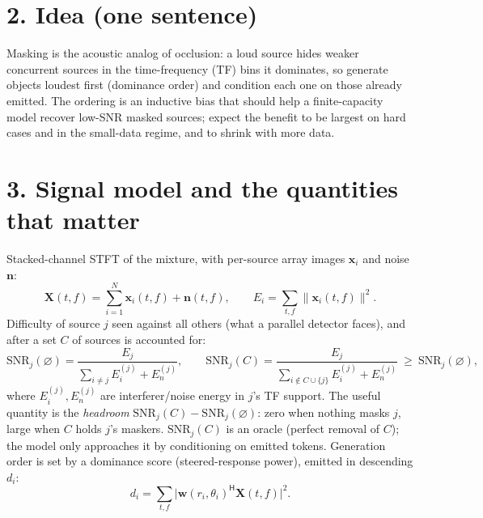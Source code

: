 \documentclass[10pt]{article}
\newcommand{\bX}{\mathbf{X}}
\newcommand{\bx}{\mathbf{x}}
\newcommand{\bn}{\mathbf{n}}
\newcommand{\bw}{\mathbf{w}}
\begin{document}
\section*{2. Idea (one sentence)}
Masking is the acoustic analog of occlusion: a loud source hides weaker concurrent
sources in the time-frequency (TF) bins it dominates, so generate objects loudest
first (dominance order) and condition each one on those already emitted. The
ordering is an inductive bias that should help a finite-capacity model recover
low-SNR masked sources; expect the benefit to be largest on hard cases and in the
small-data regime, and to shrink with more data.

\section*{3. Signal model and the quantities that matter}
Stacked-channel STFT of the mixture, with per-source array images $\bx_i$ and noise
$\bn$:
\begin{equation}
\bX(t,f)=\sum_{i=1}^{N}\bx_i(t,f)+\bn(t,f),\qquad E_i=\sum_{t,f}\|\bx_i(t,f)\|^2 .
\end{equation}
Difficulty of source $j$ seen against all others (what a parallel detector faces),
and after a set $C$ of sources is accounted for:
\begin{equation}
\mathrm{SNR}_j(\varnothing)=\frac{E_j}{\sum_{i\neq j}E_i^{(j)}+E_n^{(j)}},
\qquad
\mathrm{SNR}_j(C)=\frac{E_j}{\sum_{i\notin C\cup\{j\}}E_i^{(j)}+E_n^{(j)}}\ \geq\ \mathrm{SNR}_j(\varnothing),
\end{equation}
where $E_i^{(j)},E_n^{(j)}$ are interferer/noise energy in $j$'s TF support. The
useful quantity is the \emph{headroom} $\mathrm{SNR}_j(C)-\mathrm{SNR}_j(\varnothing)$:
zero when nothing masks $j$, large when $C$ holds $j$'s maskers. $\mathrm{SNR}_j(C)$
is an oracle (perfect removal of $C$); the model only approaches it by conditioning
on emitted tokens. Generation order is set by a dominance score (steered-response
power), emitted in descending $d_i$:
\begin{equation}
d_i=\sum_{t,f}\big|\bw(r_i,\theta_i)^{\!\mathsf{H}}\bX(t,f)\big|^2 .
\end{equation}
\end{document}
